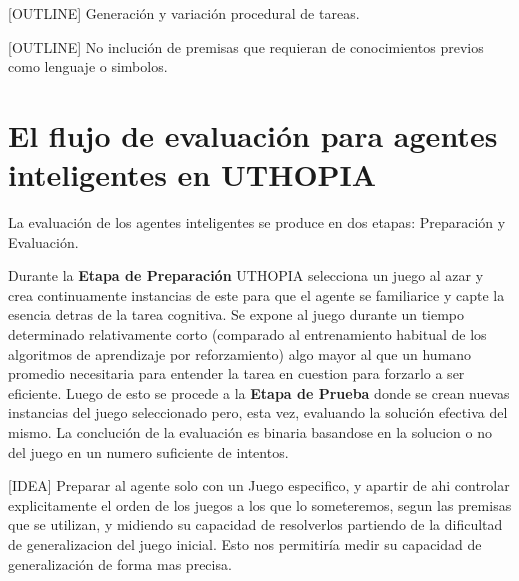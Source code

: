 [OUTLINE] Generación y variación procedural de tareas.

[OUTLINE] No inclución de premisas que requieran de conocimientos previos como lenguaje o simbolos.

\section{El flujo de evaluación para agentes inteligentes en UTHOPIA}

La evaluación de los agentes inteligentes se produce en dos etapas: Preparación y Evaluación.

Durante la \textbf{Etapa de Preparación} UTHOPIA selecciona un juego al azar y crea continuamente instancias de este para que el agente se familiarice y capte la esencia detras de la tarea cognitiva. Se expone al juego durante un tiempo determinado relativamente corto (comparado al entrenamiento habitual de los algoritmos de aprendizaje por reforzamiento) algo mayor al que un humano promedio necesitaria para entender la tarea en cuestion para forzarlo a ser eficiente. Luego de esto se procede a la \textbf{Etapa de Prueba} donde se crean nuevas instancias del juego seleccionado pero, esta vez, evaluando la solución efectiva del mismo. La conclución de la evaluación es binaria basandose en la solucion o no del juego en un numero suficiente de intentos.

[IDEA] Preparar al agente solo con un Juego especifico, y apartir de ahi controlar explicitamente el orden de los juegos a los que lo someteremos, segun las premisas que se utilizan, y midiendo su capacidad de resolverlos partiendo de la dificultad de generalizacion del juego inicial. Esto nos permitiría medir su capacidad de generalización de forma mas precisa.


